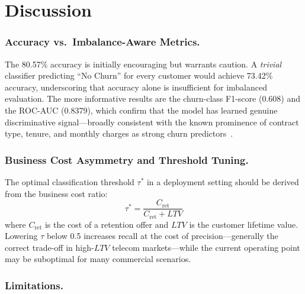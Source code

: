 \documentclass{llncs}
\begin{document}
\section{Discussion}
\label{sec:discussion}

\subsubsection{Accuracy vs.\ Imbalance-Aware Metrics.}
The 80.57\% accuracy is initially encouraging but warrants caution.
A \emph{trivial} classifier predicting ``No Churn'' for every customer
would achieve 73.42\% accuracy, underscoring that accuracy alone is
insufficient for imbalanced evaluation. The more informative results are
the churn-class F1-score (0.608) and the ROC-AUC (0.8379), which confirm
that the model has learned genuine discriminative signal---broadly consistent
with the known prominence of contract type, tenure, and monthly charges
as strong churn predictors~\cite{coussement2008churn}.

\subsubsection{Business Cost Asymmetry and Threshold Tuning.}
The optimal classification threshold $\tau^*$ in a deployment setting
should be derived from the business cost ratio:
\begin{equation}
  \tau^* = \frac{C_{\text{ret}}}{C_{\text{ret}} + LTV}
  \label{eq:tau}
\end{equation}
where $C_{\text{ret}}$ is the cost of a retention offer and $LTV$ is the
customer lifetime value. Lowering $\tau$ below 0.5 increases recall at the
cost of precision---generally the correct trade-off in high-$LTV$ telecom
markets---while the current operating point may be suboptimal for many
commercial scenarios.

\subsubsection{Limitations.}
\end{document}
